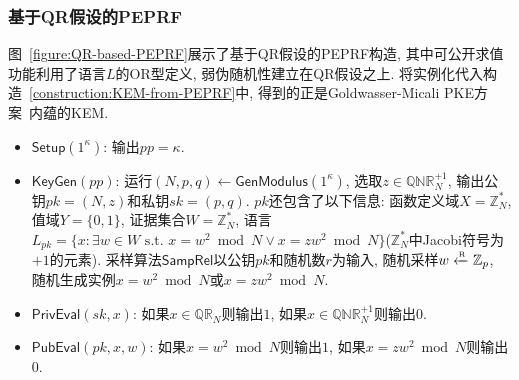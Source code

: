 \subsubsection{基于QR假设的PEPRF}
图~\ref{figure:QR-based-PEPRF}展示了基于QR假设的PEPRF构造, 其中可公开求值功能利用了语言$L$的OR型定义, 弱伪随机性建立在QR假设之上. 
将实例化代入构造~\ref{construction:KEM-from-PEPRF}中, 得到的正是Goldwasser-Micali PKE方案~\cite{GM-JCSS-1984}内蕴的KEM. 
\begin{construction} 
\begin{itemize}
    \item $\mathsf{Setup}(1^\kappa)$: 输出$pp = \kappa$. 

    \item $\mathsf{KeyGen}(pp)$: 运行$(N, p, q) \leftarrow \mathsf{GenModulus}(1^\kappa)$, 
        选取$z \in \mathbb{QNR}_N^{+1}$, 输出公钥$pk=(N, z)$和私钥$sk = (p, q)$. 
        $pk$还包含了以下信息: 函数定义域$X = \mathbb{Z}_N^*$, 值域$Y = \{0,1\}$,  证据集合$W = \mathbb{Z}_N^*$, 
        语言$L_{pk} = \{x: \exists w \in W \text{~s.t.~} x = w^2 \bmod N \vee x = zw^2 \bmod N\}$($\mathbb{Z}_N^*$中Jacobi符号为$+1$的元素). 
        采样算法$\mathsf{SampRel}$以公钥$pk$和随机数$r$为输入, 随机采样$w \xleftarrow{\textup{\tiny R}} \mathbb{Z}_p$, 
        随机生成实例$x = w^2 \bmod N$或$x = z w^2 \bmod N$.  
    
    \item $\mathsf{PrivEval}(sk, x)$: 如果$x \in \mathbb{QR}_N$则输出$1$, 如果$x \in \mathbb{QNR}_N^{+1}$则输出$0$. 

    \item $\mathsf{PubEval}(pk, x, w)$: 如果$x = w^2 \bmod N$则输出$1$, 如果$x = z w^2 \bmod N$则输出$0$. 
\end{itemize} 
\end{construction}

